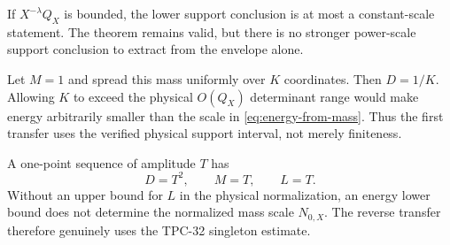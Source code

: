 \begin{remark}
If \(X^{-\lambda}Q_X\) is bounded, the lower support conclusion is
at most a constant-scale statement.  The theorem remains valid, but
there is no stronger power-scale support conclusion to extract from
the envelope alone.
\end{remark}

\begin{example}
Let \(M=1\) and spread this mass uniformly over \(K\) coordinates.
Then \(D=1/K\).  Allowing \(K\) to exceed the physical
\(O(Q_X)\) determinant range would make energy arbitrarily smaller
than the scale in \eqref{eq:energy-from-mass}.  Thus the first
transfer uses the verified physical support interval, not merely
finiteness.
\end{example}

\begin{example}
A one-point sequence of amplitude \(T\) has
\[
 D=T^2,\qquad M=T,\qquad L=T.
\]
Without an upper bound for \(L\) in the physical normalization, an
energy lower bound does not determine the normalized mass scale
\(N_{0,X}\).  The reverse transfer therefore genuinely uses the
TPC-32 singleton estimate.
\end{example}

